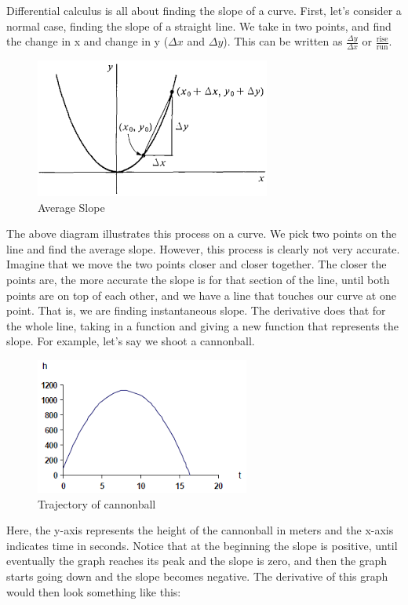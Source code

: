 Differential calculus is all about finding the slope of a curve. 
First, let's consider a normal case, finding the slope of a straight line. 
We take in two points, and find the change in x and change in y ($\Delta x$ and $\Delta y$). 
This can be written as $\frac{\Delta y}{\Delta x}$ or $\frac{\text{rise}}{\text{run}}$.

\begin{figure}[H]
\caption{Average Slope}
\includegraphics[scale=1]{../download.png}
\end{figure}

The above diagram illustrates this process on a curve. 
We pick two points on the line and find the average slope. 
However, this process is clearly not very accurate. 
Imagine that we move the two points closer and closer together. 
The closer the points are, the more accurate the slope is for that section of the line, until both points are on top of each other, and we have a line that touches our curve at one point.
That is, we are finding instantaneous slope.
The derivative does that for the whole line, taking in a function and giving a new function that represents the slope. 
For example, let's say we shoot a cannonball.

\begin{figure}[H]
\caption{Trajectory of cannonball}
\includegraphics[scale=1]{../imgres.png}
\end{figure}

Here, the y-axis represents the height of the cannonball in meters and the x-axis indicates time in seconds. 
Notice that at the beginning the slope is positive, until eventually the graph reaches its peak and the slope is zero, and then the graph starts going down and the slope becomes negative. 
The derivative of this graph would then look something like this:

